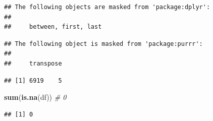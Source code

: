 \documentclass[
]{book}
\newenvironment{Shaded}{\begin{snugshade}}{\end{snugshade}}
\newcommand{\AttributeTok}[1]{\textcolor[rgb]{0.13,0.29,0.53}{#1}}
\newcommand{\CommentTok}[1]{\textcolor[rgb]{0.56,0.35,0.01}{\textit{#1}}}
\newcommand{\ConstantTok}[1]{\textcolor[rgb]{0.56,0.35,0.01}{#1}}
\newcommand{\DecValTok}[1]{\textcolor[rgb]{0.00,0.00,0.81}{#1}}
\newcommand{\FunctionTok}[1]{\textcolor[rgb]{0.13,0.29,0.53}{\textbf{#1}}}
\newcommand{\NormalTok}[1]{#1}
\newcommand{\OtherTok}[1]{\textcolor[rgb]{0.56,0.35,0.01}{#1}}
\newcommand{\SpecialCharTok}[1]{\textcolor[rgb]{0.81,0.36,0.00}{\textbf{#1}}}
\begin{document}
\begin{verbatim}
## The following objects are masked from 'package:dplyr':
## 
##     between, first, last
\end{verbatim}

\begin{verbatim}
## The following object is masked from 'package:purrr':
## 
##     transpose
\end{verbatim}

\begin{Shaded}
\end{Shaded}

\begin{verbatim}
## [1] 6919    5
\end{verbatim}

\begin{Shaded}
\begin{Highlighting}[]
\FunctionTok{sum}\NormalTok{(}\FunctionTok{is.na}\NormalTok{(df)) }\CommentTok{\# 0}
\end{Highlighting}
\end{Shaded}

\begin{verbatim}
## [1] 0
\end{verbatim}
\end{document}
